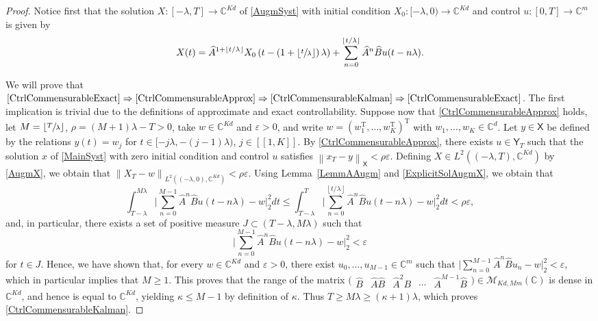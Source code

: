 \documentclass[10pt]{article}
\newcommand\implique{\mathchoice{\Longrightarrow}{\Rightarrow}{\Rightarrow}{\Rightarrow}}
\newcommand{\llbracket}{[\![}
\newcommand{\rrbracket}{]\!]}
\theoremstyle{plain}
\theoremstyle{definition}
\newcommand{\transp}{{\scriptscriptstyle\mathrm{T}}}
\newcommand{\norm}[1]{\left\lVert #1\right\lVert}
\newcommand{\floor}[1]{\left\lfloor #1 \right\rfloor}
\newcommand{\babs}[1]{\bigl\lvert #1\bigr \rvert}
\newcommand{\bgabs}[1]{\biggl\lvert #1\biggr \rvert}
\numberwithin{equation}{section}\numberwithin{figure}{section}\emergencystretch=3em
\begin{document}
\begin{proof}
Notice first that the solution $X: [-\lambda, T] \to \mathbb C^{Kd}$ of \eqref{AugmSyst} with initial condition $X_0: [-\lambda, 0) \to \mathbb C^{Kd}$ and control $u: [0, T] \to \mathbb C^m$ is given by
\begin{equation}
\label{ExplicitSolAugmX}
X(t) = \widehat A^{1 + \floor{t/\lambda}} X_0\left(t - \left(1 + \floor{\sfrac{t}{\lambda}}\right) \lambda\right) + \sum_{n=0}^{\floor{t/\lambda}} \widehat A^n \widehat B u(t - n\lambda).
\end{equation}

We will prove that $\eqref{CtrlCommensurableExact}\implique \eqref{CtrlCommensurableApprox}\implique \eqref{CtrlCommensurableKalman}\implique\eqref{CtrlCommensurableExact}$. The first implication is trivial due to the definitions of approximate and exact controllability. Suppose now that \eqref{CtrlCommensurableApprox} holds, let $M = \floor{\sfrac{T}{\lambda}}$, $\rho = (M+1)\lambda - T > 0$, take $w \in \mathbb C^{Kd}$ and $\varepsilon > 0$, and write $w = \left(w_1^\transp, \dots, w_K^\transp\right)^\transp$ with $w_1, \dots, w_K \in \mathbb C^d$. Let $y \in \mathsf X$ be defined by the relations $y(t) = w_j$ for $t \in [-j\lambda, -(j-1)\lambda)$, $j \in \llbracket 1, K\rrbracket$. By \eqref{CtrlCommensurableApprox}, there exists $u \in \mathsf Y_T$ such that the solution $x$ of \eqref{MainSyst} with zero initial condition and control $u$ satisfies $\norm{x_T - y}_{\mathsf X} < \rho\varepsilon$. Defining $X \in L^2((-\lambda, T), \mathbb C^{Kd})$ by \eqref{AugmX}, we obtain that $\norm{X_T - w}_{L^2((-\lambda, 0), \mathbb C^{Kd})} < \rho\varepsilon$. Using Lemma~\ref{LemmAAugm} and \eqref{ExplicitSolAugmX}, we obtain that
\[
\int_{T - \lambda}^{M\lambda} \bgabs{\sum_{n=0}^{M-1} \widehat A^n \widehat B u(t - n\lambda) - w}_{2}^2 dt \leq \int_{T - \lambda}^T \bgabs{\sum_{n=0}^{\floor{t/\lambda}} \widehat A^n \widehat B u(t - n\lambda) - w}_{2}^2 dt < \rho\varepsilon,
\]
and, in particular, there exists a set of positive measure $J \subset (T - \lambda, M\lambda)$ such that
\[
\bgabs{\sum_{n=0}^{M-1} \widehat A^n \widehat B u(t - n\lambda) - w}_{2}^2 < \varepsilon
\]
for $t \in J$. Hence, we have shown that, for every $w \in \mathbb C^{K d}$ and $\varepsilon > 0$, there exist $u_0, \dots, u_{M-1} \in \mathbb C^m$ such that $\babs{\sum_{n=0}^{M-1} \widehat A^n \widehat B u_n - w}_2^2 < \varepsilon$, which in particular implies that $M \geq 1$. This proves that the range of the matrix $\bigl(\begin{matrix}\widehat B & \widehat A \widehat B & \widehat A^2 B & \cdots & \widehat A^{M-1} \widehat B\end{matrix}\bigr) \in \mathcal M_{Kd, M m}(\mathbb C)$ is dense in $\mathbb C^{Kd}$, and hence is equal to $\mathbb C^{Kd}$, yielding $\kappa \leq M - 1$ by definition of $\kappa$. Thus $T \geq M \lambda \geq (\kappa + 1)\lambda$, which proves \eqref{CtrlCommensurableKalman}.


\end{proof}
\end{document}
